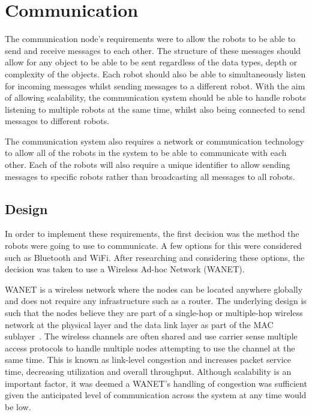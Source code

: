 \section{Communication}\label{soft/comms}
The communication node's requirements were to allow the robots to
be able to send and receive messages to each other. The structure
of these messages should allow for any object to be able to be sent
regardless of the data types, depth or complexity of the objects.
Each robot should also be able to simultaneously listen for
incoming messages whilst sending messages to a different robot.
With the aim of allowing scalability, the communication system
should be able to handle robots listening to multiple robots at the
same time, whilst also being connected to send messages to different
robots.

The communication system also requires a network or communication
technology to allow all of the robots in the system to be able to
communicate with each other. Each of the robots will also require
a unique identifier to allow sending messages to specific robots
rather than broadcasting all messages to all robots.

\subsection{Design}\label{soft/comms/design}
In order to implement these requirements,	 the first decision was the
method the robots were going to use to communicate. A few options
for this were considered such as Bluetooth and WiFi. After
researching and considering these options, the decision was taken 
to use a Wireless Ad-hoc Network (WANET).

WANET is a wireless network where the nodes can be located anywhere
globally and does not require any infrastructure such as a router. The underlying design is such that the nodes believe
they are part of a single-hop or multiple-hop wireless network at the
physical layer and the data link layer as part of the MAC sublayer~\cite{rajesh2015congestion}. The wireless channels are often shared
and use carrier sense multiple access protocols to handle multiple
nodes attempting to use the channel at the same time. This is known
as link-level congestion and increases packet service time,
decreasing utilization and overall throughput. Although scalability
is an important factor, it was deemed a WANET's handling of
congestion was sufficient given the anticipated level of
communication across the system at any time would be low.

